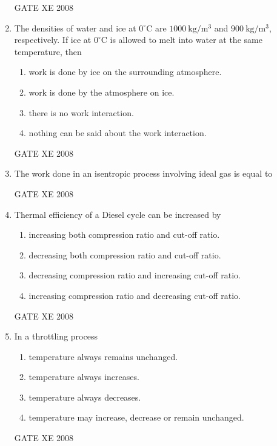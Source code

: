 \documentclass[12pt]{article}
\begin{document}
\begin{enumerate}
GATE XE 2008

\item The densities of water and ice at $0^\circ$C are $1000\ \mathrm{kg/m^3}$ and $900\ \mathrm{kg/m^3}$, respectively. If ice at $0^\circ$C is allowed to melt into water at the same temperature, then  

\begin{enumerate}
\item  work is done by ice on the surrounding atmosphere. 
\item  work is done by the atmosphere on ice. 
\item  there is no work interaction. 
\item  nothing can be said about the work interaction.  
\end{enumerate}

GATE XE 2008

\item The work done in an isentropic process involving ideal gas is equal to  

\begin{enumerate}
\end{enumerate}

GATE XE 2008

\item Thermal efficiency of a Diesel cycle can be increased by  

\begin{enumerate}
\item  increasing both compression ratio and cut-off ratio. 
\item  decreasing both compression ratio and cut-off ratio. 
\item  decreasing compression ratio and increasing cut-off ratio. 
\item  increasing compression ratio and decreasing cut-off ratio.  
\end{enumerate}

GATE XE 2008

\item In a throttling process  

\begin{enumerate}
\item  temperature always remains unchanged.
\item  temperature always increases.
\item  temperature always decreases.
\item  temperature may increase, decrease or remain unchanged.  
\end{enumerate}
GATE XE 2008


\end{enumerate}
\end{document}
